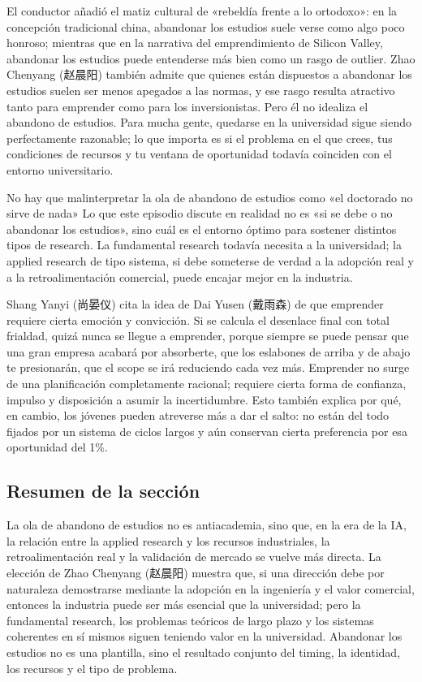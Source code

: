 \documentclass[a4paper]{article}
\begin{document}
El conductor añadió el matiz cultural de «rebeldía frente a lo ortodoxo»: en la concepción tradicional china, abandonar los estudios suele verse como algo poco honroso; mientras que en la narrativa del emprendimiento de Silicon Valley, abandonar los estudios puede entenderse más bien como un rasgo de outlier. Zhao Chenyang (赵晨阳) también admite que quienes están dispuestos a abandonar los estudios suelen ser menos apegados a las normas, y ese rasgo resulta atractivo tanto para emprender como para los inversionistas. Pero él no idealiza el abandono de estudios. Para mucha gente, quedarse en la universidad sigue siendo perfectamente razonable; lo que importa es si el problema en el que crees, tus condiciones de recursos y tu ventana de oportunidad todavía coinciden con el entorno universitario.

\begin{warningbox}{No hay que malinterpretar la ola de abandono de estudios como «el doctorado no sirve de nada»}
Lo que este episodio discute en realidad no es «si se debe o no abandonar los estudios», sino cuál es el entorno óptimo para sostener distintos tipos de research. La fundamental research todavía necesita a la universidad; la applied research de tipo sistema, si debe someterse de verdad a la adopción real y a la retroalimentación comercial, puede encajar mejor en la industria.
\end{warningbox}

Shang Yanyi (尚晏仪) cita la idea de Dai Yusen (戴雨森) de que emprender requiere cierta emoción y convicción. Si se calcula el desenlace final con total frialdad, quizá nunca se llegue a emprender, porque siempre se puede pensar que una gran empresa acabará por absorberte, que los eslabones de arriba y de abajo te presionarán, que el scope se irá reduciendo cada vez más. Emprender no surge de una planificación completamente racional; requiere cierta forma de confianza, impulso y disposición a asumir la incertidumbre. Esto también explica por qué, en cambio, los jóvenes pueden atreverse más a dar el salto: no están del todo fijados por un sistema de ciclos largos y aún conservan cierta preferencia por esa oportunidad del 1\%.

\subsection{Resumen de la sección}

La ola de abandono de estudios no es antiacademia, sino que, en la era de la IA, la relación entre la applied research y los recursos industriales, la retroalimentación real y la validación de mercado se vuelve más directa. La elección de Zhao Chenyang (赵晨阳) muestra que, si una dirección debe por naturaleza demostrarse mediante la adopción en la ingeniería y el valor comercial, entonces la industria puede ser más esencial que la universidad; pero la fundamental research, los problemas teóricos de largo plazo y los sistemas coherentes en sí mismos siguen teniendo valor en la universidad. Abandonar los estudios no es una plantilla, sino el resultado conjunto del timing, la identidad, los recursos y el tipo de problema.
\end{document}

